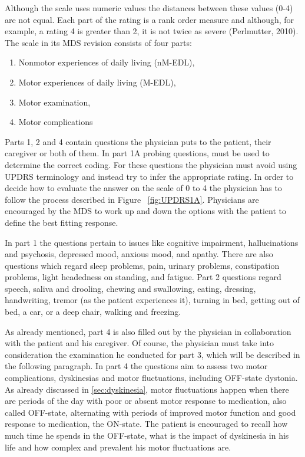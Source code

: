 Although the scale uses numeric values the distances between these values (0-4) are not equal. Each part of the rating is a rank order measure and although, for example, a rating 4 is greater than 2, it is not twice as severe (Perlmutter, 2010). The scale in its \gls{MDS} revision consists of four parts:
\begin{enumerate}
\item Nonmotor experiences of daily living (nM-EDL),
\item Motor experiences of daily living (M-EDL),
\item Motor examination,
\item Motor complications
\end{enumerate}

Parts 1, 2 and 4 contain questions the physician puts to the patient, their caregiver or both of them. In part 1A probing questions, must be used to determine the correct coding. For these questions the physician must avoid using \gls{UPDRS} terminology and instead try to infer the appropriate rating. In order to decide how to evaluate the answer on the scale of 0 to 4 the physician has to follow the process described in Figure ~\ref{fig:UPDRS1A}. Physicians are encouraged by the \gls{MDS} to work up and down the options with the patient to define the best fitting response.



In part 1 the questions pertain to issues like cognitive impairment, hallucinations and psychosis, depressed mood, anxious mood, and apathy. There are also questions which regard sleep problems, pain, urinary problems, constipation problems, light headedness on standing, and fatigue. Part 2 questions regard speech, saliva and drooling, chewing and swallowing, eating, dressing, handwriting, tremor (as the patient experiences it), turning in bed, getting out of bed, a car, or a deep chair, walking and freezing.

As already mentioned, part 4 is also filled out by the physician in collaboration with the patient and his caregiver. Of course, the physician must take into consideration the examination he conducted for part 3, which will be described in the following paragraph. In part 4 the questions aim to assess two motor complications, dyskinesias and motor fluctuations, including OFF-state dystonia. As already discussed in \ref{sec:dyskinesia}, motor fluctuations happen when there are periods of the day with poor or absent motor response to medication, also called OFF-state, alternating with periods of improved motor function and good response to medication, the ON-state. The patient is encouraged to recall how much time he spends in the OFF-state, what is the impact of dyskinesia in his life and how complex and prevalent his motor fluctuations are.

